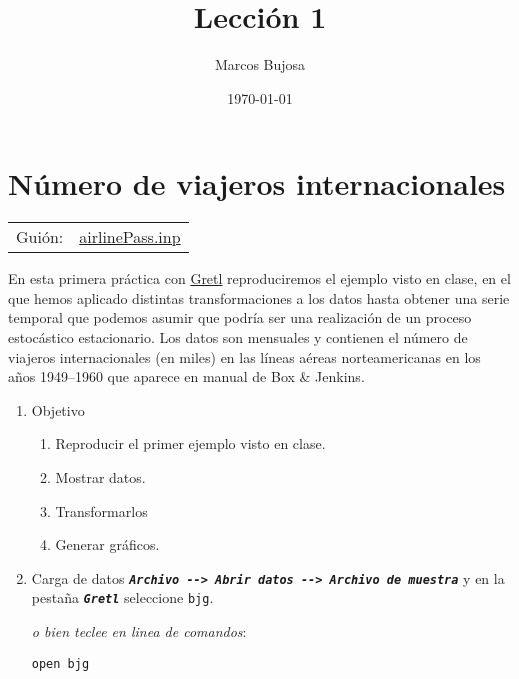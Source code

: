 \documentclass[11pt]{article}
\author{Marcos Bujosa}
\date{\today}
\title{Lección 1}
\begin{document}
\maketitle
\tableofcontents



\section{Número de viajeros internacionales}
\label{sec:orgfddfaf0}
\begin{center}
\begin{tabular}{ll}
Guión: & \href{https://github.com/mbujosab/EconometriaAplicada-SRC/blob/main/Practicas/PracticasGretl/pub/scripts/airlinePass.inp}{airlinePass.inp}\\[0pt]
\end{tabular}
\end{center}

En esta primera práctica con \href{https://gretl.sourceforge.net/es.html}{Gretl} reproduciremos el ejemplo visto en
clase, en el que hemos aplicado distintas transformaciones a los datos
hasta obtener una serie temporal que podemos asumir que podría ser una
realización de un proceso estocástico estacionario.  Los datos son
mensuales y contienen el número de viajeros internacionales (en miles)
en las líneas aéreas norteamericanas en los años 1949--1960 que
aparece en manual de Box \& Jenkins.

\begin{enumerate}
\item Objetivo
\label{sec:org203f126}
\begin{enumerate}
\item Reproducir el primer ejemplo visto en clase.
\item Mostrar datos.
\item Transformarlos
\item Generar gráficos.
\end{enumerate}

\item Carga de datos
\label{sec:org5ffcec5}
\textbf{\emph{\texttt{Archivo -{}-{}> Abrir datos -{}-{}> Archivo de muestra}}} y en la pestaña
\textbf{\emph{\texttt{Gretl}}} seleccione \texttt{bjg}.

{\vspace{0pt} \footnotesize \color{gray!70!black}
\emph{o bien teclee en linea de comandos}:
\begin{verbatim}
open bjg
\end{verbatim}
}
\end{enumerate}
\end{document}
